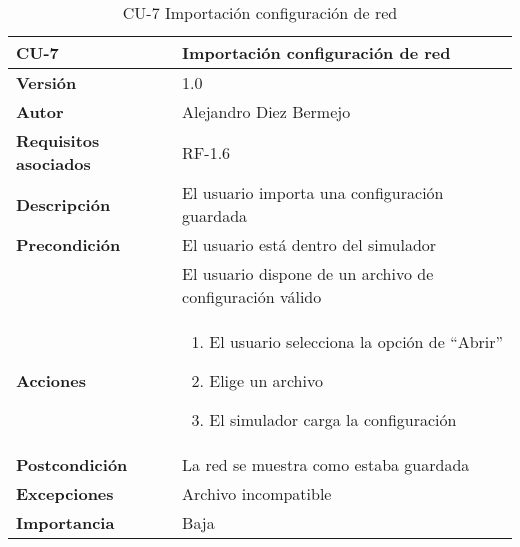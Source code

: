 \begin{table}[p]
	\centering
	\begin{tabularx}{\linewidth}{ p{} p{} }
		\toprule
		\textbf{CU-7}    & \textbf{Importación configuración de red}\\
		\toprule
		\textbf{Versión}              & 1.0    \\
		\textbf{Autor}                & Alejandro Diez Bermejo \\
		\textbf{Requisitos asociados} & RF-1.6 \\
		\textbf{Descripción}          & El usuario importa una configuración guardada \\
        \textbf{Precondición}         & El usuario está dentro del simulador \\
        		                      & El usuario dispone de un archivo de configuración válido \\
		\textbf{Acciones}             &
		\begin{enumerate}
			\def\labelenumi{\arabic{enumi}.}
			\tightlist
			\item El usuario selecciona la opción de ``Abrir''
            \item Elige un archivo
            \item El simulador carga la configuración
		\end{enumerate}\\
		\textbf{Postcondición}        & La red se muestra como estaba guardada \\
		\textbf{Excepciones}          & Archivo incompatible \\
		\textbf{Importancia}          & Baja \\
		\bottomrule
	\end{tabularx}
	\caption{CU-7 Importación configuración de red}
\end{table}

